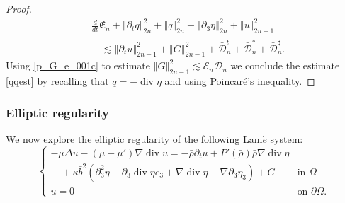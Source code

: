 \documentclass[a4paper,reqno,11pt]{amsart}
\numberwithin{equation}{section}
\providecommand{\norm}[1]{\left\Vert#1\right\Vert}
\providecommand{\sd}[1]{\mathcal{D}_{#1}}
\providecommand{\se}[1]{\mathcal{E}_{#1}}
\providecommand{\norm}[1]{\left\Vert#1\right\Vert}
\begin{document}
\begin{proof}
\begin{equation}
\begin{split}
&  { \frac{d}{dt}}\mathfrak{E}_n + \norm{ {\partial_t} q }_{2n}^2+ \norm{  q }_{2n}^2
+ \norm{  {\partial}_3   \eta  }_{2n}^2+  \norm{   u  }_{2n+1}^2
\\&\quad{\lesssim}  \norm{{\partial}_t  u  }_{2n-1}^2
+\norm{G}_{2n-1}^2+\bar{\mathcal{D}}_n^t+\bar{\mathcal{D}}_n^\ast+\bar{\mathcal{D}}_n^\sharp.
\end{split}
\end{equation}
Using \eqref{p_G_e_001c} to estimate $\norm{G}_{2n-1}^2{\lesssim} { \se{n}  }\sd{n}$  we conclude the estimate \eqref{qqest} by recalling that $q=-\operatorname{div}\eta$ and using Poincar\'e's inequality.
\end{proof}

\subsubsection{Elliptic regularity}

We now explore the elliptic regularity of the following Lam$\acute{e}$ system:
\begin{equation}\label{stokesp1c}
\begin{cases}
-\mu\Delta  {u}-(\mu+\mu')\nabla\operatorname{div} u= -\bar \rho\partial_t  u + P '(\bar{\rho} )\bar\rho \nabla \operatorname{div}  \eta
 &\\\quad+\kappa\bar b^2\left( {\partial}_3^2 \eta- {\partial}_3\operatorname{div}  \eta e_3+\nabla\operatorname{div}  \eta- \nabla{\partial}_3 \eta_3\right) +  G& \text{in }
\Omega
\\   u=0 &\text{on }{\partial}\Omega.
\end{cases}
\end{equation}
\end{document}
